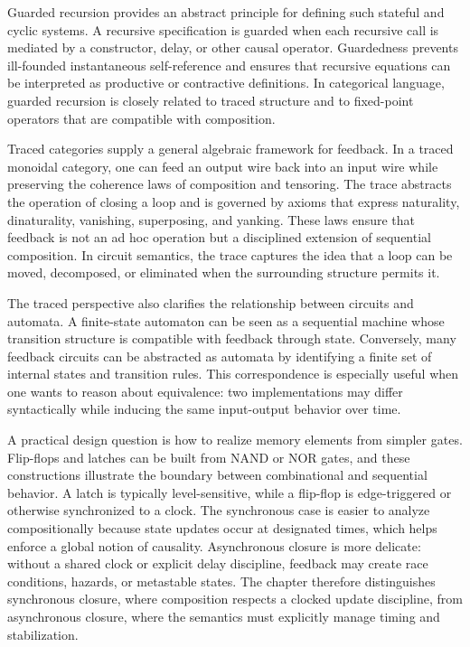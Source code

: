Guarded recursion provides an abstract principle for defining such stateful and cyclic systems. A recursive specification is guarded when each recursive call is mediated by a constructor, delay, or other causal operator. Guardedness prevents ill-founded instantaneous self-reference and ensures that recursive equations can be interpreted as productive or contractive definitions. In categorical language, guarded recursion is closely related to traced structure and to fixed-point operators that are compatible with composition.

Traced categories supply a general algebraic framework for feedback. In a traced monoidal category, one can feed an output wire back into an input wire while preserving the coherence laws of composition and tensoring. The trace abstracts the operation of closing a loop and is governed by axioms that express naturality, dinaturality, vanishing, superposing, and yanking. These laws ensure that feedback is not an ad hoc operation but a disciplined extension of sequential composition. In circuit semantics, the trace captures the idea that a loop can be moved, decomposed, or eliminated when the surrounding structure permits it.

The traced perspective also clarifies the relationship between circuits and automata. A finite-state automaton can be seen as a sequential machine whose transition structure is compatible with feedback through state. Conversely, many feedback circuits can be abstracted as automata by identifying a finite set of internal states and transition rules. This correspondence is especially useful when one wants to reason about equivalence: two implementations may differ syntactically while inducing the same input-output behavior over time.

A practical design question is how to realize memory elements from simpler gates. Flip-flops and latches can be built from NAND or NOR gates, and these constructions illustrate the boundary between combinational and sequential behavior. A latch is typically level-sensitive, while a flip-flop is edge-triggered or otherwise synchronized to a clock. The synchronous case is easier to analyze compositionally because state updates occur at designated times, which helps enforce a global notion of causality. Asynchronous closure is more delicate: without a shared clock or explicit delay discipline, feedback may create race conditions, hazards, or metastable states. The chapter therefore distinguishes synchronous closure, where composition respects a clocked update discipline, from asynchronous closure, where the semantics must explicitly manage timing and stabilization.

